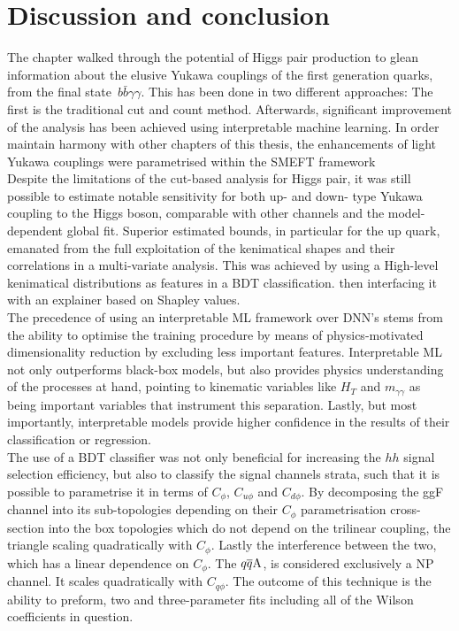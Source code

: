 \section{Discussion and conclusion \label{sec:concly}}
The chapter walked through the potential of Higgs pair production to glean information about the elusive Yukawa couplings of the first generation quarks, from the final state~$b\bar{b}\gamma \gamma$. This has been done in two different approaches: The first is the traditional cut and count method. Afterwards, significant improvement of the analysis has been achieved using interpretable machine learning.   In order maintain harmony with other chapters of this thesis, the enhancements of light Yukawa couplings were parametrised within the SMEFT framework \\ 
Despite the limitations of the cut-based analysis for Higgs pair, it was still possible to estimate notable sensitivity for both up- and down- type Yukawa coupling to the Higgs boson, comparable with other channels and the model-dependent global fit.  Superior estimated bounds, in particular for the up quark, emanated from the full exploitation of the kenimatical shapes and their correlations in a multi-variate analysis. This was achieved by using a High-level  kenimatical distributions as features in a BDT classification. then interfacing it with an explainer based on Shapley values. \\ The precedence of using an interpretable ML framework over DNN's stems from the ability to optimise the training procedure by means of physics-motivated dimensionality reduction by excluding less important features.  Interpretable ML not only outperforms black-box models, but also provides physics understanding of the processes at hand, pointing to kinematic variables like $H_T$ and $m_{\gamma\gamma}$ as being important variables that instrument this separation. Lastly, but most importantly,  interpretable models provide higher confidence in the results of their classification or regression.\\
The use of a BDT classifier was not only beneficial for increasing the $hh$ signal selection efficiency, but also to classify the signal channels strata, such that it is possible to parametrise it in terms of $C_{\phi}$, $C_{u\phi}$ and $C_{d \phi}$. By decomposing the ggF channel into its sub-topologies depending on their $C_\phi$ parametrisation cross-section into the box topologies which do not depend on the trilinear coupling, the triangle scaling quadratically with $C_\phi$. Lastly the interference between the two, which has a linear dependence on $C_\phi$. The $q\overline q \rm A$,  is considered exclusively a NP channel. It scales quadratically with $ C_{q\phi}$.  The outcome of this technique is the ability to preform, two and three-parameter fits including all of the Wilson coefficients in question. \\
